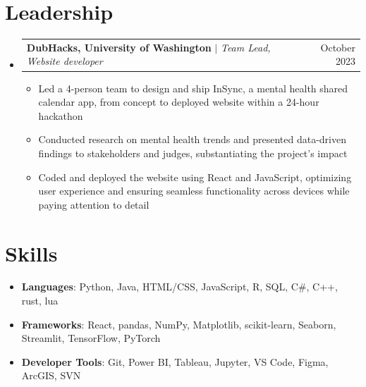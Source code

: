 \documentclass[letterpaper,11pt]{article}
\makeatletter
\newcommand{\resumeItem}[1]{
  \item\small{
    {#1 \vspace{-2pt}}
  }
}
\newcommand{\resumeProjectHeading}[2]{
    \item
    \begin{tabular*}{0.97\textwidth}{l@{\extracolsep{\fill}}r}
      \small#1 & #2 \\
    \end{tabular*}\vspace{-7pt}
}
\newcommand{\resumeSubHeadingListStart}{\begin{itemize}[leftmargin=0.15in, label={}]}
\newcommand{\resumeSubHeadingListEnd}{\end{itemize}}
\newcommand{\resumeItemListStart}{\begin{itemize}}
\newcommand{\resumeItemListEnd}{\end{itemize}\vspace{-5pt}}
\makeatother
\begin{document}
%

\section{Leadership}
    \resumeSubHeadingListStart
      \resumeProjectHeading
          {\textbf{DubHacks, University of Washington} $|$ \emph{Team Lead, Website developer}}{October 2023}
          \resumeItemListStart
            \resumeItem{Led a 4-person team to design and ship InSync, a mental health shared calendar app, from concept to deployed website within a 24-hour hackathon}
            \resumeItem{Conducted research on mental health trends and presented data-driven findings to stakeholders and judges, substantiating the project's impact}
            \resumeItem{Coded and deployed the website using React and JavaScript, optimizing user experience and ensuring seamless functionality across devices while paying attention to detail}
          \resumeItemListEnd
      \resumeSubHeadingListEnd
%

\section{Skills}
\begin{itemize}[leftmargin=0.15in, label={}]
    \small
    \item \textbf{Languages}: Python, Java, HTML/CSS, JavaScript, R, SQL, C\#, C++, rust, lua
    \item \textbf{Frameworks}: React, pandas, NumPy, Matplotlib, scikit-learn, Seaborn, Streamlit, TensorFlow, PyTorch
    \item \textbf{Developer Tools}: Git, Power BI, Tableau, Jupyter, VS Code, Figma, ArcGIS, SVN
\end{itemize}


\end{document}
